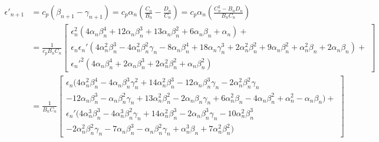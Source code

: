 \begin{align*}
\epsilon'_{n+1} &= c_p(\beta_{n+1} - \gamma_{n+1}) = c_p\alpha_n\left( \frac{C_n}{B_n} - \frac{D_n}{C_n} \right) = c_p\alpha_n\left( \frac{C_n^2 - B_nD_n}{B_nC_n} \right)\\
&= \frac{1}{c_pB_nC_n}\left[
\begin{array}{l}
\epsilon_n^2
(4\alpha_n\beta_n^4 + 12\alpha_n\beta_n^3 + 13\alpha_n\beta_n^2 + 
6\alpha_n\beta_n + \alpha_n)+\\
\epsilon_n\epsilon_n'
(4\alpha_n^2\beta_n^3 - 4\alpha_n^2\beta_n^2\gamma_n - 8\alpha_n\beta_n^4 + 
18\alpha_n\gamma_n^3 + 2\alpha_n^2\beta_n^2 + 9\alpha_n\beta_n^2 +
\alpha_n^2\beta_n + 2\alpha_n\beta_n)+\\
\epsilon_n'^2
(4\alpha_n\beta_n^4 + 2\alpha_n\beta_n^3 + 2\alpha_n^2\beta_n^2 + \alpha_n\beta_n^2)
\end{array}\right]\\
&= \frac{1}{B_nC_n}\left[
\begin{array}{l}
\epsilon_n(4\alpha_n^2\beta_n^4 - 4\alpha_n\beta_n^3\gamma_n^2 + 14\alpha_n^2\beta_n^3 - 12\alpha_n\beta_n^3\gamma_n - 2\alpha_n^2\beta_n^2\gamma_n \\
- 12\alpha_n\beta_n^3 - \alpha_n\beta_n^2\gamma_n + 13\alpha_n^2\beta_n^2 - 2\alpha_n\beta_n\gamma_n + 6\alpha_n^2\beta_n - 4\alpha_n\beta_n^2 + \alpha_n^2 - \alpha_n\beta_n) + \\
\epsilon_n' (4\alpha_n^3\beta_n^3 - 4\alpha_n^3\beta_n^2\gamma_n + 14\alpha_n^2\beta_n^3 - 2\alpha_n\beta_n^3\gamma_n - 10\alpha_n^2\beta_n^3 \\
- 2\alpha_n^2\beta_n^2\gamma_n - 7\alpha_n\beta_n^3 - \alpha_n\beta_n^2\gamma_n + \alpha_n^3\beta_n + 7\alpha_n^2\beta_n^2)
\end{array}\right]\\
\end{align*}


